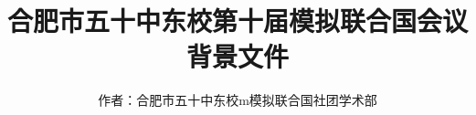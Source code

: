 \documentclass{article}
\title{合肥市五十中东校第十届模拟联合国会议\\\huge 背景文件}
\author{作者：合肥市五十中东校m模拟联合国社团学术部}
\begin{document}
    \centering
    \maketitle
    \clearpage
    \tableofcontents
\end{document}
